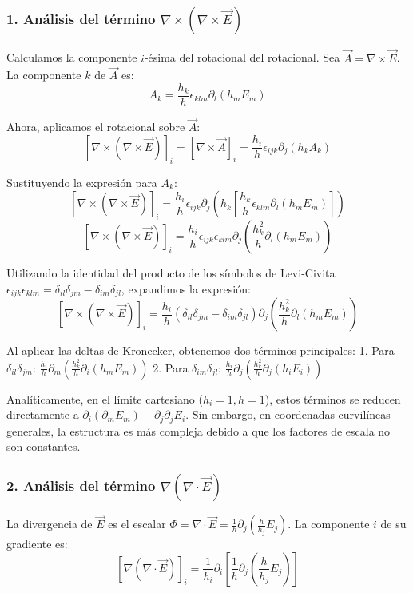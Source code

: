 \documentclass[a4paper]{article}
\begin{document}
\subsubsection*{1. Análisis del término $\nabla \times (\nabla \times \vec{E})$}

Calculamos la componente $i$-ésima del rotacional del rotacional. Sea $\vec{A} = \nabla \times \vec{E}$. La componente $k$ de $\vec{A}$ es:
$$A_k = \frac{h_k}{h} \epsilon_{klm} \partial_l (h_m E_m)$$

Ahora, aplicamos el rotacional sobre $\vec{A}$:
$$[\nabla \times (\nabla \times \vec{E})]_i = [\nabla \times \vec{A}]_i = \frac{h_i}{h} \epsilon_{ijk} \partial_j (h_k A_k)$$

Sustituyendo la expresión para $A_k$:
$$[\nabla \times (\nabla \times \vec{E})]_i = \frac{h_i}{h} \epsilon_{ijk} \partial_j \left( h_k \left[ \frac{h_k}{h} \epsilon_{klm} \partial_l (h_m E_m) \right] \right)$$
$$[\nabla \times (\nabla \times \vec{E})]_i = \frac{h_i}{h} \epsilon_{ijk} \epsilon_{klm} \partial_j \left( \frac{h_k^2}{h} \partial_l (h_m E_m) \right)$$

Utilizando la identidad del producto de los símbolos de Levi-Civita $\epsilon_{ijk} \epsilon_{klm} = \delta_{il} \delta_{jm} - \delta_{im} \delta_{jl}$, expandimos la expresión:
$$[\nabla \times (\nabla \times \vec{E})]_i = \frac{h_i}{h} (\delta_{il} \delta_{jm} - \delta_{im} \delta_{jl}) \partial_j \left( \frac{h_k^2}{h} \partial_l (h_m E_m) \right)$$

Al aplicar las deltas de Kronecker, obtenemos dos términos principales:
1. Para $\delta_{il} \delta_{jm}$: $\frac{h_i}{h} \partial_m \left( \frac{h_k^2}{h} \partial_i (h_m E_m) \right)$
2. Para $\delta_{im} \delta_{jl}$: $\frac{h_i}{h} \partial_j \left( \frac{h_k^2}{h} \partial_j (h_i E_i) \right)$

Analíticamente, en el límite cartesiano ($h_i = 1, h = 1$), estos términos se reducen directamente a $\partial_i (\partial_m E_m) - \partial_j \partial_j E_i$. Sin embargo, en coordenadas curvilíneas generales, la estructura es más compleja debido a que los factores de escala no son constantes.

\subsubsection*{2. Análisis del término $\nabla (\nabla \cdot \vec{E})$}

La divergencia de $\vec{E}$ es el escalar $\Phi = \nabla \cdot \vec{E} = \frac{1}{h} \partial_j \left( \frac{h}{h_j} E_j \right)$.
La componente $i$ de su gradiente es:
$$[\nabla (\nabla \cdot \vec{E})]_i = \frac{1}{h_i} \partial_i \left[ \frac{1}{h} \partial_j \left( \frac{h}{h_j} E_j \right) \right]$$
\end{document}
